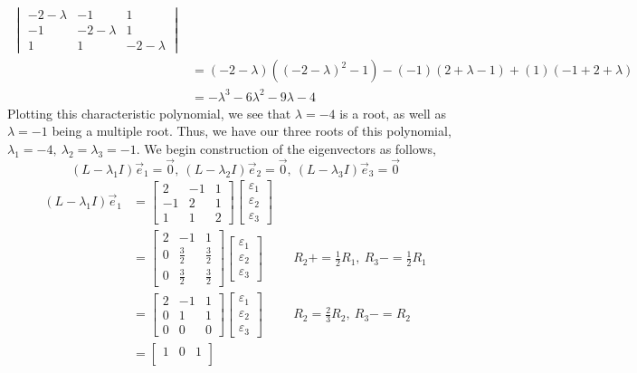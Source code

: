 \documentclass[letterpaper,10pt]{article}
\begin{document}
\begin{description}
\begin{align*}
\begin{vmatrix}
-2-\lambda & -1 & 1\\
-1 & -2-\lambda & 1\\
1 & 1 & -2-\lambda
\end{vmatrix}\\
&=(-2-\lambda)((-2-\lambda)^2-1)-(-1)(2+\lambda-1)+(1)(-1+2+\lambda)\\
&=-\lambda^3-6\lambda^2-9\lambda-4
\end{align*}
Plotting this characteristic polynomial, we see that $\lambda=-4$ is a root, as well as $\lambda=-1$ being a multiple root. Thus, we have our three roots of this polynomial, $\lambda_1=-4,\ \lambda_2=\lambda_3=-1$. We begin construction of the eigenvectors as follows,
\[(L-\lambda_1I)\vec{e}_1=\vec{0},\ (L-\lambda_2I)\vec{e}_2=\vec{0},\ (L-\lambda_3I)\vec{e}_3=\vec{0}\]
\begin{align*}
(L-\lambda_1I)\vec{e}_1 &=\begin{bmatrix}
2 & -1 & 1\\
-1 & 2 & 1\\
1 & 1 & 2
\end{bmatrix}\begin{bmatrix}
\varepsilon_1\\
\varepsilon_2\\
\varepsilon_3
\end{bmatrix}\\
&=\begin{bmatrix}
2 & -1 & 1\\
0 & \frac{3}{2} & \frac{3}{2}\\
0 & \frac{3}{2} & \frac{3}{2}
\end{bmatrix}\begin{bmatrix}
\varepsilon_1\\
\varepsilon_2\\
\varepsilon_3
\end{bmatrix} && R_2+=\frac{1}{2}R_1,\ R_3-=\frac{1}{2}R_1\\
&=\begin{bmatrix}
2 & -1 & 1\\
0 & 1 & 1\\
0 & 0 & 0
\end{bmatrix}\begin{bmatrix}
\varepsilon_1\\
\varepsilon_2\\
\varepsilon_3
\end{bmatrix} && R_2=\frac{2}{3}R_2,\ R_3-=R_2\\
&=\begin{bmatrix}
1 & 0 & 1\\

\end{bmatrix}
\end{align*}
\end{description}
\end{document}
